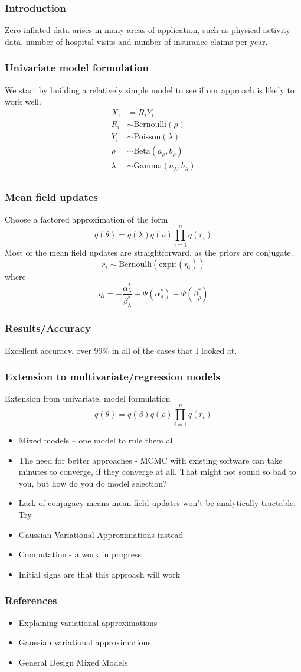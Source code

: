 \documentclass{beamer}
\begin{document}
\begin{frame}
\frametitle{Introduction}
Zero inflated data arises in many areas of application, such as physical activity data,
number of hospital visits and number of insurance claims per year.
\end{frame}

\begin{frame}
\frametitle{Univariate model formulation}
We start by building a relatively simple model to see if our approach is
likely to work well.
\begin{align*}
X_i &= R_i Y_i \\
R_i &\sim \text{Bernoulli}(\rho) \\
Y_i &\sim \text{Poisson}(\lambda) \\
\rho &\sim \text{Beta}(a_\rho, b_\rho) \\
\lambda &\sim \text{Gamma}(a_\lambda, b_\lambda) \\
\end{align*}
\end{frame}

\begin{frame}
\frametitle{Mean field updates}
Choose a factored approximation of the form
$$
q(\theta) = q(\lambda) q(\rho) \prod_{i=1}^n q(r_i)
$$
Most of the mean field updates are straightforward, as the priors are conjugate.
$$
r_i \sim \text{Bernoulli}(\text{expit}(\eta_i))
$$
where
$$
\eta_i = - \frac{\alpha_\lambda^*}{\beta_\lambda^*} + \Psi(\alpha_\rho^*) - \Psi(\beta_\rho^*)
$$
\end{frame}

\begin{frame}
\frametitle{Results/Accuracy}
Excellent accuracy, over 99\% in all of the cases that I looked at.
\end{frame}

\begin{frame}
\frametitle{Extension to multivariate/regression models}
Extension from univariate, model formulation
$$
q(\theta) = q(\beta) q(\rho) \prod_{i=1}^n q(r_i)
$$
\begin{itemize}
\item Mixed models -- one model to rule them all
\item The need for better approaches - MCMC with existing software can take minutes to
converge, if they converge at all. That might not sound so bad to you, but how do you
do model selection?
\item Lack of conjugacy means mean field updates won't be analytically tractable. Try
\item Gaussian Variational Approximations instead
\item Computation - a work in progress
\item Initial signs are that this approach will work
\end{itemize}
\end{frame}

\begin{frame}
\frametitle{References}
\begin{itemize}
\item Explaining variational approximations
\item Gaussian variational approximations
\item General Design Mixed Models
\end{itemize}
\end{frame}
\end{document}
